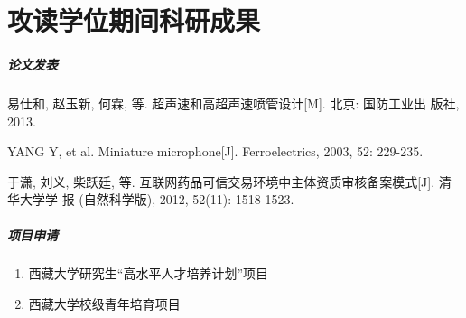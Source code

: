 
\chapter{攻读学位期间科研成果}



\paragraph{论文发表}
\begin{publications}
	\item
	易仕和, 赵玉新, 何霖, 等. 超声速和高超声速喷管设计[M]. 北京: 国防工业出
	版社, 2013.
	\item 
	YANG Y, et al. Miniature microphone[J]. Ferroelectrics, 2003, 52: 229-235.
	\item 
	于潇, 刘义, 柴跃廷, 等. 互联网药品可信交易环境中主体资质审核备案模式[J]. 清华大学学
	报 (自然科学版), 2012, 52(11): 1518-1523.
	
	
\end{publications}
\paragraph{项目申请}
\begin{enumerate}
	\item
	西藏大学研究生“高水平人才培养计划”项目
	\item 
	西藏大学校级青年培育项目
\end{enumerate}